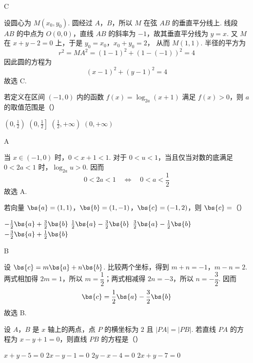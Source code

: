\begin{answer}
C
\end{answer}

\begin{solution}
设圆心为 \(M(x_0,y_0)\). 圆经过 \(A\)，\(B\)，所以 \(M\) 在弦 \(AB\) 的垂直平分线上. 线段 \(AB\) 的中点为 \(O(0,0)\)，直线 \(AB\) 的斜率为 \(-1\)，故其垂直平分线为 \(y=x\). 又 \(M\) 在 \(x+y-2=0\) 上，于是
\(y_0=x_0\)，\(x_0+y_0=2\)，
从而 \(M(1,1)\). 半径的平方为
\[
r^2=MA^2=(1-1)^2+(1-(-1))^2=4
\]
因此圆的方程为
\[
(x-1)^2+(y-1)^2=4
\]
故选 C.
\end{solution}

\begin{problem}
若定义在区间 \((-1,0)\) 内的函数 \(f(x)=\log_{2a}(x+1)\) 满足 \(f(x)>0\)，则 \(a\) 的取值范围是（\quad）

\choices
    {\(\left(0,\frac{1}{2}\right)\)}
    {\(\left(0,\frac{1}{2}\right]\)}
    {\(\left(\frac{1}{2},+\infty\right)\)}
    {\((0,+\infty)\)}
\end{problem}

\begin{answer}
A
\end{answer}

\begin{solution}
当 \(x\in(-1,0)\) 时，\(0<x+1<1\). 对于 \(0<u<1\)，当且仅当对数的底满足 \(0<2a<1\) 时，\(\log_{2a}u>0\). 因而
\[
0<2a<1\quad\Longleftrightarrow\quad 0<a<\frac12
\]
故选 A.
\end{solution}

\begin{problem}
若向量 \(\bs{a}=(1,1)\)，\(\bs{b}=(1,-1)\)，\(\bs{c}=(-1,2)\)，则 \(\bs{c}=\)（\quad）

\choices
    {\(-\frac{1}{2}\bs{a}+\frac{3}{2}\bs{b}\)}
    {\(\frac{1}{2}\bs{a}-\frac{3}{2}\bs{b}\)}
    {\(\frac{3}{2}\bs{a}-\frac{1}{2}\bs{b}\)}
    {\(-\frac{3}{2}\bs{a}+\frac{1}{2}\bs{b}\)}
\end{problem}

\begin{answer}
B
\end{answer}

\begin{solution}
设 \(\bs{c}=m\bs{a}+n\bs{b}\). 比较两个坐标，得到
\(m+n=-1\)，\(m-n=2\).
两式相加得 \(2m=1\)，所以 \(m=\dfrac12\)；两式相减得 \(2n=-3\)，所以 \(n=-\dfrac32\). 因而
\[
\bs{c}=\frac12\bs{a}-\frac32\bs{b}
\]
故选 B.
\end{solution}

\begin{problem}
设 \(A\)，\(B\) 是 \(x\) 轴上的两点，点 \(P\) 的横坐标为 \(2\) 且 \(\lvert PA\rvert=\lvert PB\rvert\). 若直线 \(PA\) 的方程为 \(x-y+1=0\)，则直线 \(PB\) 的方程是（\quad）

\choices
    {\(x+y-5=0\)}
    {\(2x-y-1=0\)}
    {\(2y-x-4=0\)}
    {\(2x+y-7=0\)}
\end{problem}


